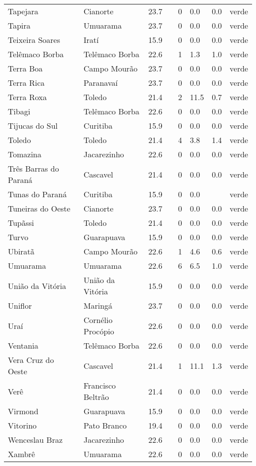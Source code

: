 \begin{longtable}{l|lllllll}
  Tapejara & Cianorte & 23.7 &  & 0 & 0.0 & 0.0 & verde \\ 
  Tapira & Umuarama & 23.7 &  & 0 & 0.0 & 0.0 & verde \\ 
  Teixeira Soares & Iratí & 15.9 &  & 0 & 0.0 & 0.0 & verde \\ 
  Telêmaco Borba & Telêmaco Borba & 22.6 &  & 1 & 1.3 & 1.0 & verde \\ 
  Terra Boa & Campo Mourão & 23.7 &  & 0 & 0.0 & 0.0 & verde \\ 
  Terra Rica & Paranavaí & 23.7 &  & 0 & 0.0 & 0.0 & verde \\ 
  Terra Roxa & Toledo & 21.4 &  & 2 & 11.5 & 0.7 & verde \\ 
  Tibagi & Telêmaco Borba & 22.6 &  & 0 & 0.0 & 0.0 & verde \\ 
  Tijucas do Sul & Curitiba & 15.9 &  & 0 & 0.0 & 0.0 & verde \\ 
  Toledo & Toledo & 21.4 &  & 4 & 3.8 & 1.4 & verde \\ 
  Tomazina & Jacarezinho & 22.6 &  & 0 & 0.0 & 0.0 & verde \\ 
  Três Barras do Paraná & Cascavel & 21.4 &  & 0 & 0.0 & 0.0 & verde \\ 
  Tunas do Paraná & Curitiba & 15.9 &  & 0 & 0.0 &  & verde \\ 
  Tuneiras do Oeste & Cianorte & 23.7 &  & 0 & 0.0 & 0.0 & verde \\ 
  Tupãssi & Toledo & 21.4 &  & 0 & 0.0 & 0.0 & verde \\ 
  Turvo & Guarapuava & 15.9 &  & 0 & 0.0 & 0.0 & verde \\ 
  Ubiratã & Campo Mourão & 22.6 &  & 1 & 4.6 & 0.6 & verde \\ 
  Umuarama & Umuarama & 22.6 &  & 6 & 6.5 & 1.0 & verde \\ 
  União da Vitória & União da Vitória & 15.9 &  & 0 & 0.0 & 0.0 & verde \\ 
  Uniflor & Maringá & 23.7 &  & 0 & 0.0 & 0.0 & verde \\ 
  Uraí & Cornélio Procópio & 22.6 &  & 0 & 0.0 & 0.0 & verde \\ 
  Ventania & Telêmaco Borba & 22.6 &  & 0 & 0.0 & 0.0 & verde \\ 
  Vera Cruz do Oeste & Cascavel & 21.4 &  & 1 & 11.1 & 1.3 & verde \\ 
  Verê & Francisco Beltrão & 21.4 &  & 0 & 0.0 & 0.0 & verde \\ 
  Virmond & Guarapuava & 15.9 &  & 0 & 0.0 & 0.0 & verde \\ 
  Vitorino & Pato Branco & 19.4 &  & 0 & 0.0 & 0.0 & verde \\ 
  Wenceslau Braz & Jacarezinho & 22.6 &  & 0 & 0.0 & 0.0 & verde \\ 
  Xambrê & Umuarama & 22.6 &  & 0 & 0.0 & 0.0 & verde \\ 
  \hline
\end{longtable}
